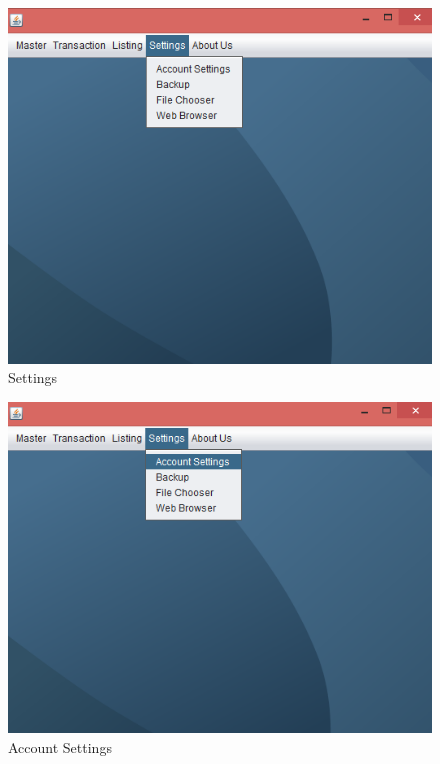 \begin{figure}[ht]
\begin{center}
\includegraphics[scale=0.5]{images/image46.png}
\end{center}
\caption{Settings}
\label{Settings}
\end{figure}

\begin{figure}[ht]
\begin{center}
\includegraphics[scale=0.5]{images/image47.png}
\end{center}
\caption{Account Settings}
\label{Account Settings}
\end{figure}

